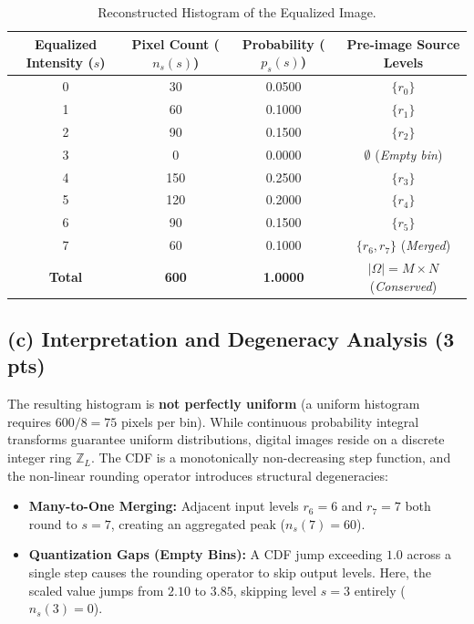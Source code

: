 \documentclass[11pt,a4paper]{article}
\begin{document}
\begin{table}[htbp]
\centering
\small
\caption{Reconstructed Histogram of the Equalized Image.}
\label{tab:p5_equalized_hist}
\begin{tabular}{cccc}
\toprule
\textbf{Equalized Intensity ($s$)} & \textbf{Pixel Count ($n_s(s)$)} & \textbf{Probability ($p_s(s)$)} & \textbf{Pre-image Source Levels} \\
\midrule
0 & 30  & 0.0500 & $\{r_0\}$ \\
1 & 60  & 0.1000 & $\{r_1\}$ \\
2 & 90  & 0.1500 & $\{r_2\}$ \\
3 & 0   & 0.0000 & $\emptyset$ (\textit{Empty bin}) \\
4 & 150 & 0.2500 & $\{r_3\}$ \\
5 & 120 & 0.2000 & $\{r_4\}$ \\
6 & 90  & 0.1500 & $\{r_5\}$ \\
7 & 60  & 0.1000 & $\{r_6, r_7\}$ (\textit{Merged}) \\
\midrule
\textbf{Total} & \textbf{600} & \textbf{1.0000} & $|\Omega| = M \times N$ (\textit{Conserved}) \\
\bottomrule
\end{tabular}
\end{table}

\subsection{(c) Interpretation and Degeneracy Analysis (3 pts)}
The resulting histogram is \textbf{not perfectly uniform} (a uniform histogram requires $600 / 8 = 75$ pixels per bin).
While continuous probability integral transforms guarantee uniform distributions, digital images reside on a discrete integer ring $\mathbb{Z}_L$. The CDF is a monotonically non-decreasing step function, and the non-linear rounding operator introduces structural degeneracies:
\begin{itemize}
    \item \textbf{Many-to-One Merging:} Adjacent input levels $r_6 = 6$ and $r_7 = 7$ both round to $s = 7$, creating an aggregated peak ($n_s(7) = 60$).
    \item \textbf{Quantization Gaps (Empty Bins):} A CDF jump exceeding $1.0$ across a single step causes the rounding operator to skip output levels. Here, the scaled value jumps from $2.10$ to $3.85$, skipping level $s = 3$ entirely ($n_s(3) = 0$).
\end{itemize}
\end{document}
